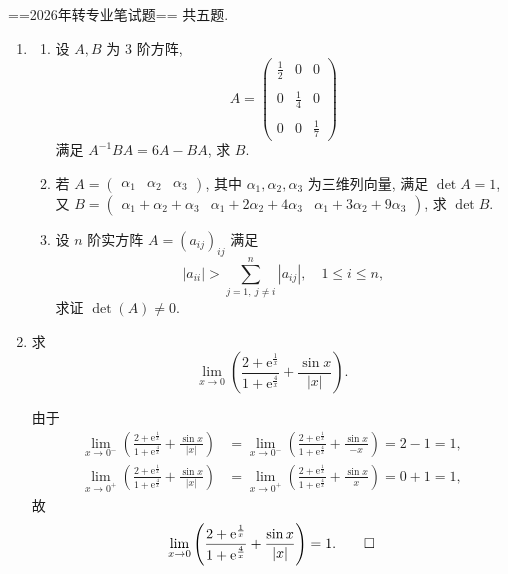 

==2026年转专业笔试题==
共五题. 
\begin{enumerate}
\item[一、]
\begin{enumerate}
    \item[(1)]
    设 $A,B$ 为 $3$ 阶方阵, 
    $$A=\begin{pmatrix}
        \frac{1}{2} & 0 & 0 \\ \\
        0 & \frac{1}{4} & 0 \\ \\
        0 & 0 & \frac{1}{7}
    \end{pmatrix}$$
    满足 $A^{-1}BA=6A-BA$,
    求 $B$. 
    \item[(2)]
    若 $A=\begin{pmatrix} \alpha_1 & \alpha_2 & \alpha_3 \end{pmatrix}$,
    其中 $\alpha_1,\alpha_2,\alpha_3$ 为三维列向量,
    满足 $\det A=1$,
    又 $B=\begin{pmatrix}
        \alpha_1+\alpha_2+\alpha_3 &
        \alpha_1+2\alpha_2+4\alpha_3 &
        \alpha_1+3\alpha_2+9\alpha_3
    \end{pmatrix}$,
    求 $\det B$. 
    \item[(3)]
    设 $n$ 阶实方阵 $A=(a_{ij})_{ij}$ 满足
    $$|a_{ii}|>\sum_{j=1,\ j\not=i}^n|a_{ij}|,\quad 1\leqslant i \leqslant n,$$
    求证 $\det(A)\not=0$. 
\end{enumerate}

\item[二、]
求
$$\lim_{x\to 0}\left(\frac{2+\mathrm{e}^{\frac{1}{x}}}{1+\mathrm{e}^{\frac{4}{x}}}+\frac{\sin x}{|x|}\right).$$
\begin{proofc}
    由于
    \begin{align*}
        \lim_{x\to 0^{-}}\left(\frac{2+\mathrm{e}^{\frac{1}{x}}}{1+\mathrm{e}^{\frac{4}{x}}}+\frac{\sin x}{|x|}\right)
        & = \lim_{x\to 0^{-}}\left(\frac{2+\mathrm{e}^{\frac{1}{x}}}{1+\mathrm{e}^{\frac{4}{x}}}+\frac{\sin x}{-x}\right)
        = 2-1 = 1,\\
        \lim_{x\to 0^{+}}\left(\frac{2+\mathrm{e}^{\frac{1}{x}}}{1+\mathrm{e}^{\frac{4}{x}}}+\frac{\sin x}{|x|}\right)
        & = \lim_{x\to 0^{+}}\left(\frac{2+\mathrm{e}^{\frac{1}{x}}}{1+\mathrm{e}^{\frac{4}{x}}}+\frac{\sin x}{x}\right)
        = 0+1 = 1,
    \end{align*}
    故
    $$\lim_{x\to 0}\left(\frac{2+\mathrm{e}^{\frac{1}{x}}}{1+\mathrm{e}^{\frac{4}{x}}}+\frac{\sin x}{|x|}\right)=1.\qedhere$$
\end{proofc}


\end{enumerate}
